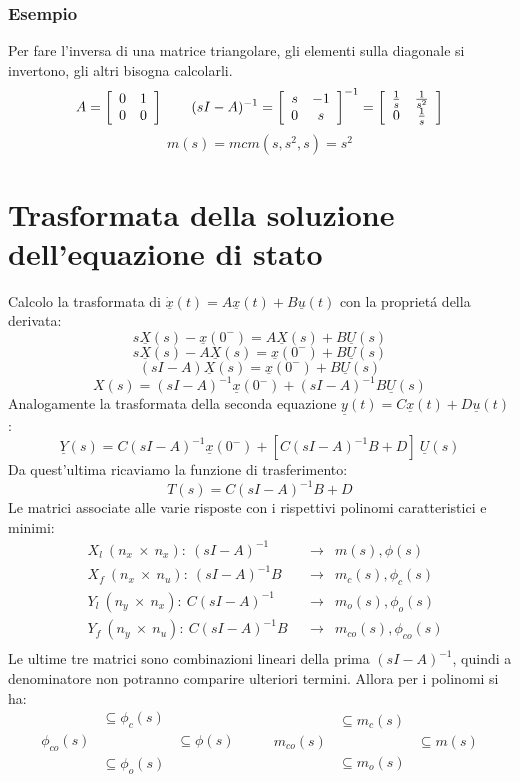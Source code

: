 \documentclass[../main.tex]{subfiles}
\begin{document}
	\subsubsection*{Esempio}
	Per fare l'inversa di una matrice triangolare, gli elementi sulla diagonale si invertono, gli altri bisogna calcolarli.
	\[ A = \left[ \begin{array}{cc} 0 & 1\\ 0 & 0 \end{array} \right] \qquad (sI - A)^{-1} = \left[ \begin{array}{cc} s & -1\\ 0 & s \end{array} \right]^{-1} = \left[ \begin{array}{cc} \frac{1}{s} & \frac{1}{s^2}\\ 0 & \frac{1}{s} \end{array} \right] \]
	\[ m(s) = mcm( s, s^2, s) = s^2 \]
	\section{Trasformata della soluzione dell'equazione di stato}
	Calcolo la trasformata di $ \dot{\underline x}(t) = A \underline x(t) + B \underline u(t) $ con la propriet\'a della derivata:
	\[ s \underline X(s) - \underline x(0^-) = A \underline X(s) + B \underline U(s) \]
	\[ s \underline X(s) - A \underline X(s) = \underline x(0^-) + B \underline U(s) \]
	\[ (sI - A) \underline X(s) = \underline x(0^-) + B \underline U(s) \]
	\begin{equation}
		X(s) = (sI-A)^{-1} \underline x(0^-) + (sI-A)^{-1} B \underline U(s)
	\end{equation}
	Analogamente la trasformata della seconda equazione $ \underline y(t) = C \underline x(t) + D \underline u(t) $:
	\begin{equation}
		\underline Y(s) = C (sI-A)^{-1} \underline x(0^-) + [C(sI-A)^{-1}B + D]\ \underline U(s)
	\end{equation}
	Da quest'ultima ricaviamo la funzione di trasferimento:
	\[ T(s) = C (sI-A)^{-1} B + D \]
	Le matrici associate alle varie risposte con i rispettivi polinomi caratteristici e minimi:
	\begin{align*}
		&X_l\ (n_x\ \times\ n_x):\ (sI-A)^{-1} &&\longrightarrow &m(s), \phi(s)\\
		&X_f\ (n_x\ \times\ n_u):\ (sI-A)^{-1}B &&\longrightarrow &m_c(s), \phi_c(s)\\
		&Y_l\ (n_y\ \times\ n_x):\ C(sI-A)^{-1} &&\longrightarrow &m_o(s), \phi_o(s)\\
		&Y_f\ (n_y\ \times\ n_u):\ C(sI-A)^{-1}B &&\longrightarrow &m_{co}(s), \phi_{co}(s)\\
	\end{align*}
	Le ultime tre matrici sono combinazioni lineari della prima $ (sI-A)^{-1} $, quindi a denominatore non potranno comparire ulteriori termini. Allora per i polinomi si ha:
	\[ \begin{array}{ccc}
					 &\subseteq \phi_c(s) &\\
		\phi_{co}(s) & 					  &\subseteq \phi(s)\\
					 &\subseteq \phi_o(s) &\\
	\end{array} \qquad
	\begin{array}{ccc}
				  &\subseteq m_c(s) &\\
		m_{co}(s) & 				&\subseteq m(s)\\
				  &\subseteq m_o(s) &\\
	\end{array} \]
\end{document}

